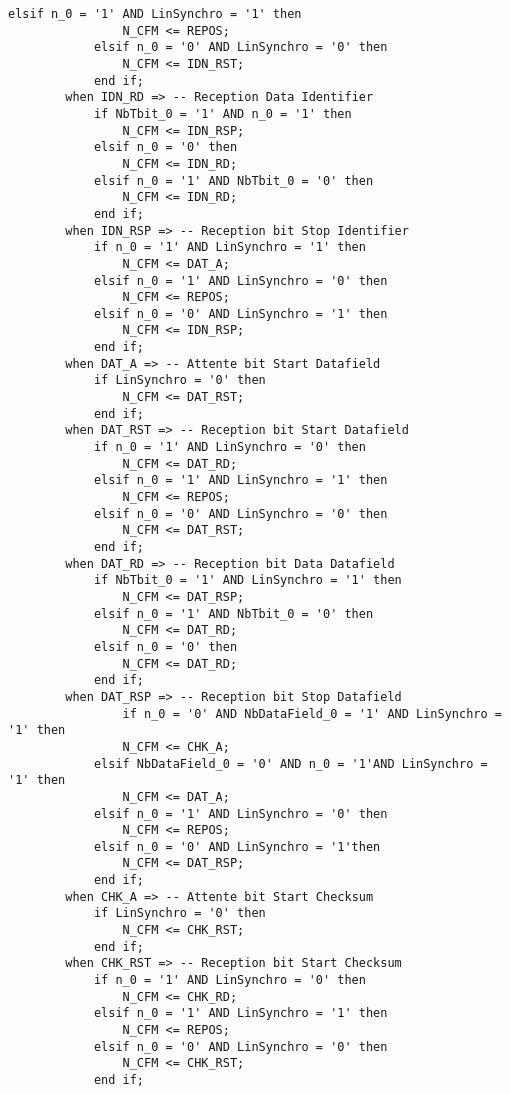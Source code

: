 \begin{lstlisting}[style=VHDLStyle, caption={Réseau Combinatoire d’Entrée Reception Trame}]
            elsif n_0 = '1' AND LinSynchro = '1' then
                N_CFM <= REPOS;
            elsif n_0 = '0' AND LinSynchro = '0' then
                N_CFM <= IDN_RST;
            end if;       
        when IDN_RD => -- Reception Data Identifier
            if NbTbit_0 = '1' AND n_0 = '1' then
                N_CFM <= IDN_RSP;
            elsif n_0 = '0' then
                N_CFM <= IDN_RD;
            elsif n_0 = '1' AND NbTbit_0 = '0' then
                N_CFM <= IDN_RD;
            end if;     
        when IDN_RSP => -- Reception bit Stop Identifier
            if n_0 = '1' AND LinSynchro = '1' then
                N_CFM <= DAT_A;
            elsif n_0 = '1' AND LinSynchro = '0' then
                N_CFM <= REPOS;
            elsif n_0 = '0' AND LinSynchro = '1' then
                N_CFM <= IDN_RSP;
            end if;   
        when DAT_A => -- Attente bit Start Datafield
            if LinSynchro = '0' then
                N_CFM <= DAT_RST;
            end if;   
        when DAT_RST => -- Reception bit Start Datafield
            if n_0 = '1' AND LinSynchro = '0' then
                N_CFM <= DAT_RD;
            elsif n_0 = '1' AND LinSynchro = '1' then
                N_CFM <= REPOS;
            elsif n_0 = '0' AND LinSynchro = '0' then
                N_CFM <= DAT_RST;
            end if;         
        when DAT_RD => -- Reception bit Data Datafield
            if NbTbit_0 = '1' AND LinSynchro = '1' then
                N_CFM <= DAT_RSP;
            elsif n_0 = '1' AND NbTbit_0 = '0' then
                N_CFM <= DAT_RD;
            elsif n_0 = '0' then
                N_CFM <= DAT_RD;
            end if;          
        when DAT_RSP => -- Reception bit Stop Datafield
		        if n_0 = '0' AND NbDataField_0 = '1' AND LinSynchro = '1' then
                N_CFM <= CHK_A;
            elsif NbDataField_0 = '0' AND n_0 = '1'AND LinSynchro = '1' then
                N_CFM <= DAT_A;
            elsif n_0 = '1' AND LinSynchro = '0' then
                N_CFM <= REPOS;
            elsif n_0 = '0' AND LinSynchro = '1'then
                N_CFM <= DAT_RSP;
            end if;   
        when CHK_A => -- Attente bit Start Checksum
            if LinSynchro = '0' then
                N_CFM <= CHK_RST;
            end if;           
        when CHK_RST => -- Reception bit Start Checksum
            if n_0 = '1' AND LinSynchro = '0' then
                N_CFM <= CHK_RD;
            elsif n_0 = '1' AND LinSynchro = '1' then
                N_CFM <= REPOS;
			elsif n_0 = '0' AND LinSynchro = '0' then
                N_CFM <= CHK_RST;
            end if;         

\end{lstlisting}
